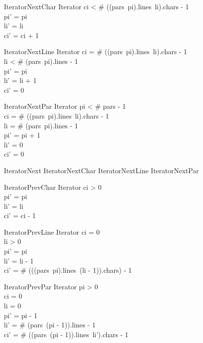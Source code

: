 \documentclass{article}
\begin{document}
\begin{schema}{IteratorNextChar}
	\Delta Iterator 
\where
	ci < \# ((pars~pi).lines~li).chars - 1 \\
	pi' = pi \\
	li' = li \\
	ci' = ci + 1
\end{schema}

\begin{schema}{IteratorNextLine}
	\Delta Iterator 
\where
	ci = \# ((pars~pi).lines~li).chars - 1 \\
	li < \# (pars~pi).lines - 1 \\
	pi' = pi \\
	li' = li + 1 \\
	ci' = 0
\end{schema}

\begin{schema}{IteratorNextPar}
	\Delta Iterator 
\where
	pi < \# pars - 1 \\
	ci = \# ((pars~pi).lines~li).chars - 1 \\
	li = \# (pars~pi).lines - 1 \\
	pi' = pi + 1 \\
	li' = 0 \\
	ci' = 0
\end{schema}

\begin{zed}
IteratorNext  IteratorNextChar \lor IteratorNextLine \lor IteratorNextPar
\end{zed}

\begin{schema}{IteratorPrevChar}
	\Delta Iterator 
\where
	ci > 0 \\
	pi' = pi \\
	li' = li \\
	ci' = ci - 1
\end{schema}

\begin{schema}{IteratorPrevLine}
	\Delta Iterator 
\where
	ci = 0 \\
	li > 0 \\
	pi' = pi \\
	li' = li - 1 \\
	ci' = \# (((pars~pi).lines~(li - 1)).chars) - 1 
\end{schema}

\begin{schema}{IteratorPrevPar}
	\Delta Iterator 
\where
	pi > 0 \\
	ci = 0 \\
	li = 0 \\
	pi' = pi - 1 \\
	li' = \# (pars~(pi - 1)).lines - 1 \\
	ci' = \# ((pars~(pi - 1)).lines~li').chars - 1
\end{schema}
\end{document}

